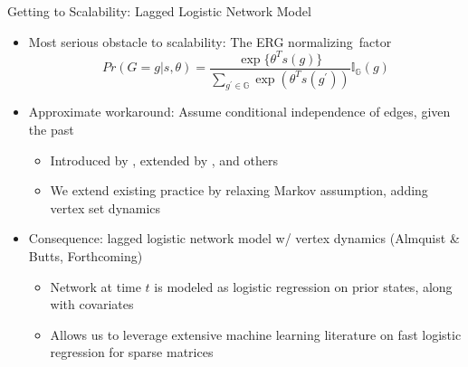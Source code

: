 \documentclass[10pt]{beamer}
\begin{document}
\begin{frame}{Getting to Scalability: Lagged Logistic Network Model}


\begin{block}{}
\begin{itemize}
\item \small{Most serious obstacle to scalability: The ERG normalizing~factor }
\small{
$$Pr(G=g|s,\theta) = \frac{\exp\{\theta^Ts(g)\}}{\sum_{g^{'} \in \mathbb{G}} \exp(\theta^Ts(g^{'}))} \mathbb{I}_{\mathbb{G}}(g)$$
}
\end{itemize}
\end{block}
\small{
\begin{block}{}
\begin{itemize}
\item Approximate workaround: Assume \alert{conditional independence of edges, given the past} 

\vspace{-.05in}
\begin{itemize}
\item Introduced by \cite{robbins99}, extended by \cite{xing07}, and others
\item We extend existing practice by relaxing Markov assumption, adding vertex set dynamics
\end{itemize}
\item Consequence: \alert{lagged logistic network model w/ vertex dynamics} (Almquist \& Butts, Forthcoming)

\vspace{-.05in}
\begin{itemize}
\item Network at time $t$ is modeled as logistic regression on prior states, along with covariates
\item Allows us to leverage extensive machine learning literature on fast logistic regression for sparse matrices
\end{itemize}
\end{itemize}
\end{block}
}
\end{frame}
\end{document}
